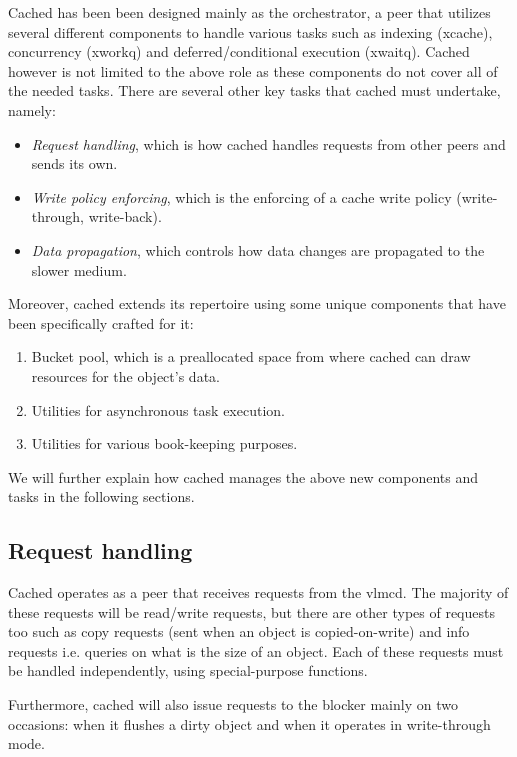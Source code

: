 
Cached has been been designed mainly as the orchestrator, a peer that utilizes 
several different components to handle various tasks such as indexing (xcache), 
concurrency (xworkq) and deferred/conditional execution (xwaitq). Cached 
however is not limited to the above role as these components do not cover all 
of the needed tasks. There are several other key tasks that cached must 
undertake, namely:

\begin{itemize}
	\item \textit{Request handling}, which is how cached handles requests 
		from other peers and sends its own.
	\item \textit{Write policy enforcing}, which is the enforcing of a 
		cache write policy (write-through, write-back).
	\item \textit{Data propagation}, which controls how data changes are 
		propagated to the slower medium.
\end{itemize}

Moreover, cached extends its repertoire using some unique components that have
been specifically crafted for it:

\begin{enumerate}
	\item Bucket pool, which is a preallocated space from where cached can draw 
		resources for the object's data.
	\item Utilities for asynchronous task execution.
	\item Utilities for various book-keeping purposes.
\end{enumerate}

We will further explain how cached manages the above new components and tasks 
in the following sections.

\subsection{Request handling}

Cached operates as a peer that receives requests from the vlmcd. The majority of 
these requests will be read/write requests, but there are other types of 
requests too such as copy requests (sent when an object is copied-on-write) and 
info requests i.e. queries on what is the size of an object. Each of these 
requests must be handled independently, using special-purpose functions.

Furthermore, cached will also issue requests to the blocker mainly on two 
occasions: when it flushes a dirty object and when it operates in write-through 
mode.

